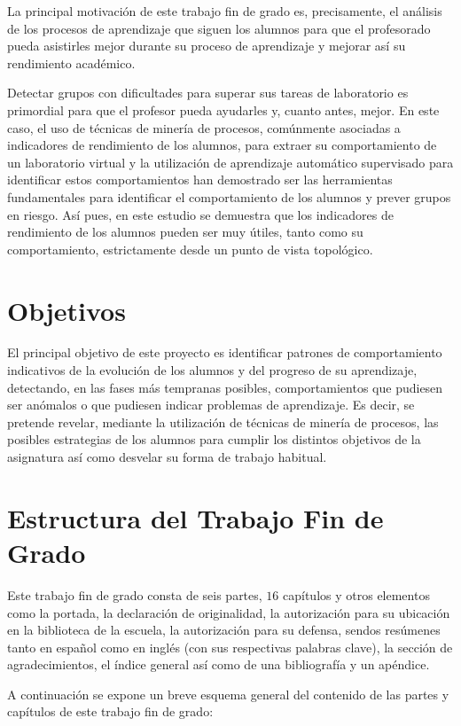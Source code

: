 La principal motivación de este trabajo fin de grado es, precisamente, el análisis de los procesos de aprendizaje que siguen los alumnos para que el profesorado pueda asistirles mejor durante su proceso de aprendizaje y mejorar así su rendimiento académico.

Detectar grupos con dificultades para superar sus tareas de laboratorio es primordial para que el profesor pueda ayudarles y, cuanto antes, mejor. En este caso, el uso de técnicas de minería de procesos, comúnmente asociadas a indicadores de rendimiento de los alumnos, para extraer su comportamiento de un laboratorio virtual y la utilización de aprendizaje automático supervisado para identificar estos comportamientos han demostrado ser las herramientas fundamentales para identificar el comportamiento de los alumnos y prever grupos en riesgo. Así pues, en este estudio se demuestra que los indicadores de rendimiento de los alumnos pueden ser muy útiles, tanto como su comportamiento, estrictamente desde un punto de vista topológico.

\section{Objetivos}

El principal objetivo de este proyecto es identificar patrones de comportamiento indicativos de la evolución de los alumnos y del progreso de su aprendizaje, detectando, en las fases más tempranas posibles, comportamientos que pudiesen ser anómalos o que pudiesen indicar problemas de aprendizaje. Es decir, se pretende revelar, mediante la utilización de técnicas de minería de procesos, las posibles estrategias de los alumnos para cumplir los distintos objetivos de la asignatura así como desvelar su forma de trabajo habitual.

\section{Estructura del Trabajo Fin de Grado}

Este trabajo fin de grado consta de seis partes, $16$ capítulos y otros elementos como la portada, la declaración de originalidad, la autorización para su ubicación en la biblioteca de la escuela, la autorización para su defensa, sendos resúmenes tanto en español como en inglés (con sus respectivas palabras clave), la sección de agradecimientos, el índice general así como de una bibliografía y un apéndice.

A continuación se expone un breve esquema general del contenido de las partes y capítulos de este trabajo fin de grado:

